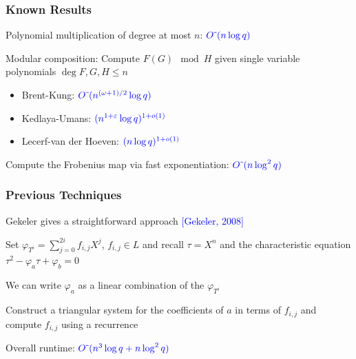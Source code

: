 \documentclass{beamer}
\newcommand{\blue}{\textcolor{blue}}
\newcommand{\spa}{\vspace{0.2cm}}
\begin{document}




\begin{frame}
\frametitle{Known Results}

Polynomial multiplication of degree at most $n$: $\blue{O\tilde{~}(n\log q)}$


\spa

Modular composition: Compute $F(G) \mod H$ given single variable polynomials $\deg F, G,H \leq n$
\begin{itemize}
\item Brent-Kung: $\blue{O\tilde{~}(n^{(\omega+1)/2}\log q)} $ %
    \item Kedlaya-Umans: $\blue{(n^{1 + \varepsilon}\log q)^{1+o(1)}}$
    \item Lecerf-van der Hoeven: $\blue{(n \log q)^{1+o(1)}}$
\end{itemize}



\spa

Compute the Frobenius map via fast exponentiation: $\blue{O\tilde{~}(n\log^2 q)}$ %
    


\end{frame}





\begin{frame}
\frametitle{Previous Techniques}


     Gekeler gives a straightforward approach \blue{[Gekeler, 2008]}
     
     \spa
     
    Set $\varphi_{T^i} = \sum_{j=0}^{2i}f_{i,j} X^j$, $f_{i,j} \in L$ and recall $\tau = X^n$ and the characteristic equation $\tau^2 - \varphi_a\tau + \varphi_b = 0$
    
    \spa
    
    We can write $\varphi_a$ as a linear combination of the $\varphi_{T^i}$
    
    \spa
    
     Construct a triangular system for the coefficients of $a$ in terms of $f_{i,j}$ and compute $f_{i,j}$ using a recurrence
     
     \spa
     Overall runtime: $\blue{O\tilde{~}(n^3 \log q + n\log^2 q)}$



\end{frame}
\end{document}
